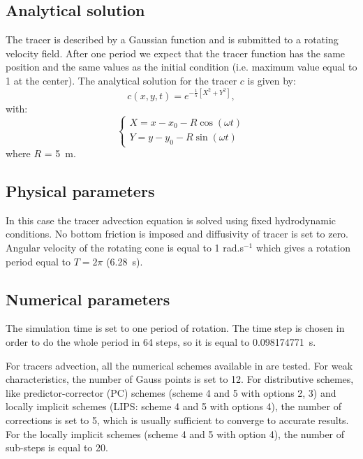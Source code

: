 \subsection{Analytical solution}

The tracer is described by a Gaussian function and is submitted to a rotating
velocity field.
After one period we expect that the tracer function has the same position and
the same values as the initial condition (i.e. maximum value equal to 1 at the
center).
The analytical solution for the tracer $c$ is given by:
\begin{equation*}
c(x,y,t)=e^{-\frac{1}{5}[X^2+Y^2]},
\end{equation*}
with:
\begin{equation*}
\left\{
    \begin{array}{ll}
        X = x - x_0 - R \cos(\omega t) \\
        Y = y - y_0 - R \sin(\omega t)
    \end{array}
\right.
\end{equation*}
where $R$ = 5~m.

\subsection{Physical parameters}

In this case the tracer advection equation is solved using fixed hydrodynamic
conditions.
No bottom friction is imposed and diffusivity of tracer is set to zero.
Angular velocity of the rotating cone is equal to 1 rad.s$^{-1}$ which gives a
rotation period equal to $T=2\pi$ (6.28~s).

\subsection{Numerical parameters}

The simulation time is set to one period of rotation.
The time step is chosen in order to do the whole period in 64 steps, so it is
equal to 0.098174771~s.

For tracers advection, all the numerical schemes available in  are
tested.
For weak characteristics, the number of Gauss points is set to 12.
For distributive schemes, like predictor-corrector (PC) schemes (scheme 4 and 5
with options 2, 3) and locally implicit schemes (LIPS: scheme 4 and 5 with
options 4), the number of corrections is set to 5, which is usually sufficient
to converge to accurate results. For the locally implicit schemes (scheme 4 and
5 with option 4), the number of sub-steps is equal to 20.

